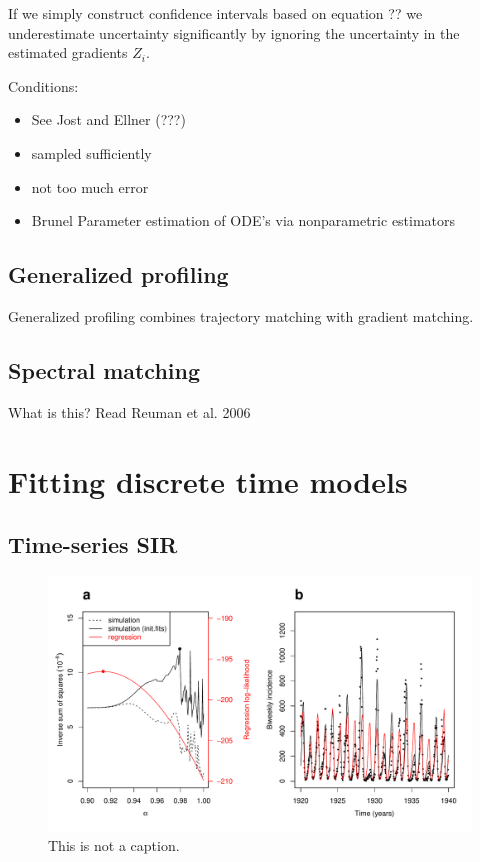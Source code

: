\documentclass{article}
\begin{document}
If we simply construct confidence intervals based on equation ?? we underestimate uncertainty significantly by ignoring the uncertainty in the estimated gradients $Z_i$.

Conditions:
\begin{itemize}
	\item See Jost and Ellner (???)
	\item sampled sufficiently
	\item not too much error
	\item Brunel Parameter estimation of ODE’s via nonparametric estimators
\end{itemize}



\subsection{Generalized profiling}

Generalized profiling combines trajectory matching with gradient matching.

\subsection{Spectral matching}

What is this? Read Reuman et al. 2006

\section{Fitting discrete time models}

\subsection{Time-series SIR}

\begin{figure}[t]
\includegraphics[width=\textwidth]{../figure/tsir_factorial_fig.pdf}
\caption{This is not a caption.}
\end{figure}
\end{document}

